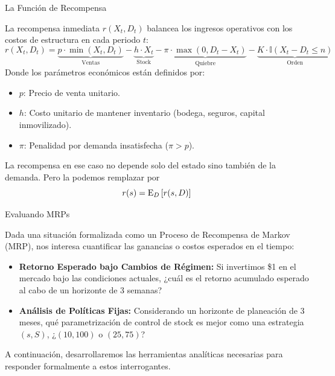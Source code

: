 \documentclass[xcolor=dvipsnames]{beamer}
\begin{document}
\begin{frame}{La Funci\'on de Recompensa}

La recompensa inmediata $r(X_t, D_t)$ balancea los ingresos operativos con los costos de estructura en cada periodo $t$:
{\small
$$
r(X_t, D_t) = \underbrace{p \cdot \min(X_t, D_t)}_{\text{Ventas}} - \underbrace{h \cdot X_t}_{\text{Stock}} - \underbrace{\pi \cdot \max(0, D_t - X_t)}_{\text{Quiebre}} - \underbrace{K \cdot \mathbb{I}(X_t - D_t \leq n)}_{\text{Orden}}
$$
}
\vspace{0.1cm}
Donde los parámetros económicos están definidos por:
\begin{itemize}
    \item $p$: Precio de venta unitario.
    \item $h$: Costo unitario de mantener inventario (bodega, seguros, capital inmovilizado).
    \item $\pi$: Penalidad por demanda insatisfecha ($\pi > p$).
\end{itemize}
\pause
La recompensa en ese caso no depende solo del estado sino tambi\'en de la demanda. Pero la podemos remplazar por
$$
r(s) = {\rm E}_D\left[ r(s,D) \right]
$$
\end{frame}

\begin{frame}{Evaluando MRPs}

Dada una situaci\'on formalizada como un Proceso de Recompensa de Markov (MRP), nos interesa cuantificar las ganancias o costos esperados en el tiempo:

\begin{itemize}
    \item \textbf{Retorno Esperado bajo Cambios de R\'egimen:} Si invertimos \$1 en el mercado bajo las condiciones actuales, ¿cu\'al es el retorno acumulado esperado al cabo de un horizonte de 3 semanas?
    \item \textbf{An\'alisis de Pol\'iticas Fijas:} Considerando un horizonte de planeaci\'on de 3 meses, qu\'e parametrizaci\'on de control de stock es mejor como una estrategia $(s, S)$,  ¿$(10,100)$ o $(25, 75)$?
\end{itemize}

\vspace{0.3cm}
A continuaci\'on, desarrollaremos las herramientas anal\'iticas necesarias para responder formalmente a estos interrogantes.
\end{frame}
\end{document}
